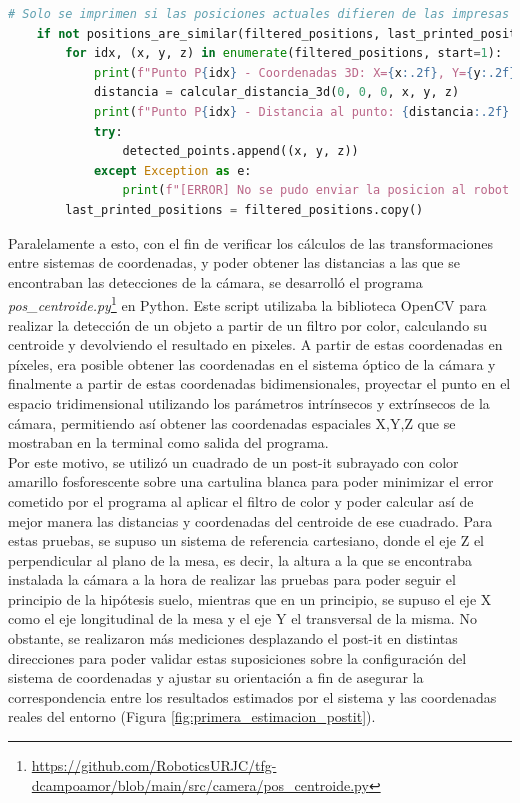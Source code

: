 \begin{code}[H]
   \begin{lstlisting}[language=Python] 
    # Solo se imprimen si las posiciones actuales difieren de las impresas anteriormente, usando stability_threshold para considerar el ruido
    if not positions_are_similar(filtered_positions, last_printed_positions, stability_threshold):
        for idx, (x, y, z) in enumerate(filtered_positions, start=1):
            print(f"Punto P{idx} - Coordenadas 3D: X={x:.2f}, Y={y:.2f}, Z=410.00")
            distancia = calcular_distancia_3d(0, 0, 0, x, y, z)
            print(f"Punto P{idx} - Distancia al punto: {distancia:.2f} milimetros")
            try:
                detected_points.append((x, y, z))
            except Exception as e:
                print(f"[ERROR] No se pudo enviar la posicion al robot: {e}")
        last_printed_positions = filtered_positions.copy()
    \end{lstlisting}
    \caption{Fragmento del código donde se comparan posiciones para evitar que se dupliquen}
    \label{cod:comparacion_duplicacion}
\end{code} 

Paralelamente a esto, con el fin de verificar los cálculos de las transformaciones entre sistemas de coordenadas, y poder obtener las distancias a las que se encontraban las detecciones de la cámara, se desarrolló el programa \textit{pos\_centroide.py}\footnote{\url{https://github.com/RoboticsURJC/tfg-dcampoamor/blob/main/src/camera/pos_centroide.py}} en Python. Este script utilizaba la biblioteca OpenCV para realizar la detección de un objeto a partir de un filtro por color, calculando su centroide y devolviendo el resultado en pixeles. A partir de estas coordenadas en píxeles, era posible obtener las coordenadas en el sistema óptico de la cámara y finalmente a partir de estas coordenadas bidimensionales, proyectar el punto en el espacio tridimensional utilizando los parámetros intrínsecos y extrínsecos de la cámara, permitiendo así obtener las coordenadas espaciales X,Y,Z que se mostraban en la terminal como salida del programa. \\

Por este motivo, se utilizó un cuadrado de un post-it subrayado con color amarillo fosforescente sobre una cartulina blanca para poder minimizar el error cometido por el programa al aplicar el filtro de color y poder calcular así de mejor manera las distancias y coordenadas del centroide de ese cuadrado. Para estas pruebas, se supuso un sistema de referencia cartesiano, donde el eje Z el perpendicular al plano de la mesa, es decir, la altura a la que se encontraba instalada la cámara a la hora de realizar las pruebas para poder seguir el principio de la hipótesis suelo, mientras que en un principio, se supuso el eje X como el eje longitudinal de la mesa y el eje Y el transversal de la misma. No obstante, se realizaron más mediciones desplazando el post-it en distintas direcciones para poder validar estas suposiciones sobre la configuración del sistema de coordenadas y ajustar su orientación a fin de asegurar la correspondencia entre los resultados estimados por el sistema y las coordenadas reales del entorno (Figura \ref{fig:primera_estimacion_postit}).

